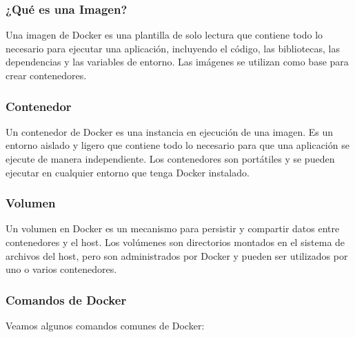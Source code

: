 \documentclass{article}
\begin{document}
\subsubsection*{¿Qué es una Imagen?}
Una imagen de Docker es una plantilla de solo lectura que contiene todo lo necesario para ejecutar una aplicación, incluyendo el código, las bibliotecas, las dependencias y las variables de entorno. Las imágenes se utilizan como base para crear contenedores.

\subsubsection*{Contenedor}
Un contenedor de Docker es una instancia en ejecución de una imagen. Es un entorno aislado y ligero que contiene todo lo necesario para que una aplicación se ejecute de manera independiente. Los contenedores son portátiles y se pueden ejecutar en cualquier entorno que tenga Docker instalado.

\subsubsection*{Volumen}
Un volumen en Docker es un mecanismo para persistir y compartir datos entre contenedores y el host. Los volúmenes son directorios montados en el sistema de archivos del host, pero son administrados por Docker y pueden ser utilizados por uno o varios contenedores.

\subsubsection*{Comandos de Docker}

Veamos algunos comandos comunes de Docker:
\end{document}
